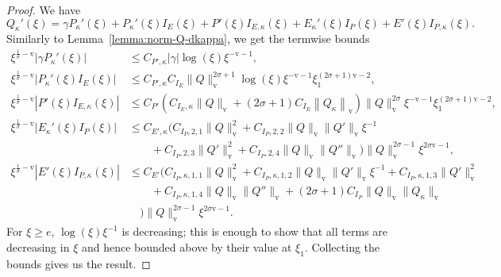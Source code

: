\documentclass[11pt]{article}
\newcommand{\normv}{\mathrm{v}}
\begin{document}
\begin{proof}
  We have
  \begin{equation*}
    Q_{\kappa}'(\xi)
    = \gamma P_{\kappa}'(\xi)
    + P_{\kappa}'(\xi)I_{E}(\xi)
    + P'(\xi)I_{E,\kappa}(\xi)
    + E_{\kappa}'(\xi)I_{P}(\xi)
    + E'(\xi)I_{P,\kappa}(\xi).
  \end{equation*}
  Similarly to Lemma~\ref{lemma:norm-Q-dkappa}, we get the termwise
  bounds
  \begin{align*}
    \xi^{\frac{1}{\sigma} - \normv}|\gamma P_{\kappa}'(\xi)|
    &\leq C_{P',\kappa}|\gamma|\log(\xi)\xi^{-\normv - 1},\\
    \xi^{\frac{1}{\sigma} - \normv}|P_{\kappa}'(\xi)I_{E}(\xi)|
    &\leq C_{P',\kappa}C_{I_{E}}
      \|Q\|_{\normv}^{2\sigma + 1}\log(\xi)\xi^{-\normv - 1}
      \xi_{1}^{(2\sigma + 1)\normv - 2},\\
    \xi^{\frac{1}{\sigma} - \normv}|P'(\xi)I_{E,\kappa}(\xi)|
    &\leq C_{P'}(
      C_{I_{E},\kappa}\|Q\|_{\normv}
      + (2\sigma + 1)C_{I_{E}}\left\|Q_{\kappa}\right\|_{\normv}
      )\|Q\|_{\normv}^{2\sigma}\xi^{-\normv - 1}\xi_{1}^{(2\sigma + 1)\normv - 2},\\
    \xi^{\frac{1}{\sigma} - \normv}|E_{\kappa}'(\xi)I_{P}(\xi)|
    &\leq C_{E',\kappa}\Big(
      C_{I_{P},2,1}\|Q\|_{\normv}^{2}
      + C_{I_{P},2,2}\|Q\|_{\normv}\|Q'\|_{\normv}\xi^{-1}\\
    &\qquad+ C_{I_{P},2,3}\|Q'\|_{\normv}^{2}
      + C_{I_{P},2,4}\|Q\|_{\normv}\|Q''\|_{\normv}
      \Big)\|Q\|_{\normv}^{2\sigma - 1}
      \xi^{2\sigma\normv - 1},\\
    \xi^{\frac{1}{\sigma} - \normv}|E'(\xi)I_{P,\kappa}(\xi)|
    &\leq C_{E'}\Big(C_{I_{P},\kappa,1,1}\|Q\|_{\normv}^{2}
      + C_{I_{P},\kappa,1,2}\|Q\|_{\normv}\|Q'\|_{\normv}\xi^{-1}
      + C_{I_{P},\kappa,1,3}\|Q'\|_{\normv}^{2}\\
    &\qquad+ C_{I_{P},\kappa,1,4}\|Q\|_{\normv}\|Q''\|_{\normv}
      + (2\sigma + 1)C_{I_{P}}\|Q\|_{\normv}\|Q_{\kappa}\|_{\normv}\\
    &\quad\Big)\|Q\|_{\normv}^{2\sigma - 1}\xi^{2\sigma\normv - 1}.
  \end{align*}
  For \(\xi \geq e\), \(\log(\xi)\xi^{-1}\) is
  decreasing; this is enough to show that all terms are decreasing in
  \(\xi\) and hence bounded above by their value at \(\xi_{1}\).
  Collecting the bounds gives us the result.
\end{proof}
\end{document}
